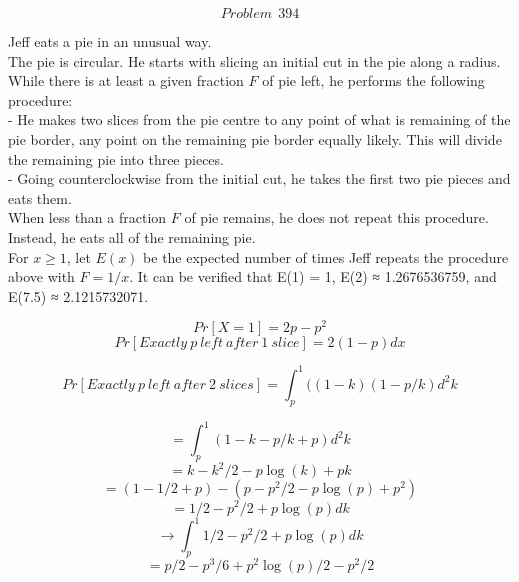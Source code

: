 \documentclass [12pt] {article}
\begin{document}
$$Problem\ \ 394$$

Jeff eats a pie in an unusual way. \\
The pie is circular. He starts with slicing an initial cut in the pie along a radius. \\
While there is at least a given fraction $F$ of pie left, he performs the following procedure: \\
- He makes two slices from the pie centre to any point of what is remaining of the pie border, any point on the remaining pie border equally likely. This will divide the remaining pie into three pieces. \\
- Going counterclockwise from the initial cut, he takes the first two pie pieces and eats them. \\
When less than a fraction $F$ of pie remains, he does not repeat this procedure. Instead, he eats all of the remaining pie.\\

For $x \geq 1$, let $E(x)$ be the expected number of times Jeff repeats the procedure above with $F = 1/x$.
It can be verified that E(1) = 1, E(2) ≈ 1.2676536759, and E(7.5) ≈ 2.1215732071.

$$Pr[X=1] = 2p - p^2 $$
$$Pr[Exactly\ p\ left\ after\ 1\ slice] = 2(1-p) dx$$

$$Pr[Exactly\ p\ left\ after\ 2\ slices] = \int_{p}^1((1-k)(1-p/k) d^2k$$

$$ = \int_{p}^1(1 - k - p/k + p) d^2k$$
$$ = k - k^2/2 - p \log(k) + pk$$
$$ = (1 - 1/2  + p) - ( p - p^2/2 - p \log(p) + p^2)$$
$$ = 1/2  - p^2/2 + p \log(p) dk$$
$$ \rightarrow \int_p^1 1/2  - p^2/2 + p \log(p) dk$$
$$ = p/2 - p^3/6 + p^2\log(p)/2 - p^2/2$$
\end{document}
